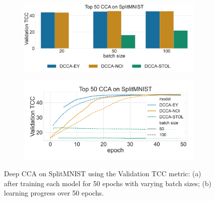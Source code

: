 \begin{figure}
    \centering
    \begin{subfigure}[b]{0.49\textwidth}
        \centering
        \includegraphics[width=\textwidth]{figures/DCCA/SplitMNIST_models_different_batch_sizes}
        \caption{}
        \label{fig:corr_mnist}
    \end{subfigure}
    \hfill
    \begin{subfigure}[b]{0.49\textwidth}
        \centering
        \includegraphics[width=\textwidth]{figures/DCCA/SplitMNIST_allbatchsizes_pcc}
        \caption{}
        \label{fig:lr_mnist}
    \end{subfigure}
    \caption{Deep CCA on SplitMNIST using the Validation TCC metric: (a) after training each model for 50 epochs with varying batch sizes; (b) learning progress over 50 epochs.}
    \label{fig: mnist}
\end{figure}


